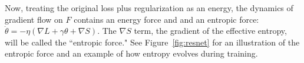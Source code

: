 \documentclass{article}
\theoremstyle{plain}
\newtheorem{lemma}{Lemma}
\begin{document}
Now, treating the original loss plus regularization as an energy, the dynamics of gradient flow on $F$ contains an energy force and and an entropic force: $\dot{\theta} = -\eta (\nabla L + \gamma \theta + {\nabla S})$. The  $\nabla S$ term, the gradient of the effective entropy, will be called the ``entropic force." See Figure~\ref{fig:resnet} for an illustration of the entropic force and an example of how entropy evolves during training.







\end{document}
